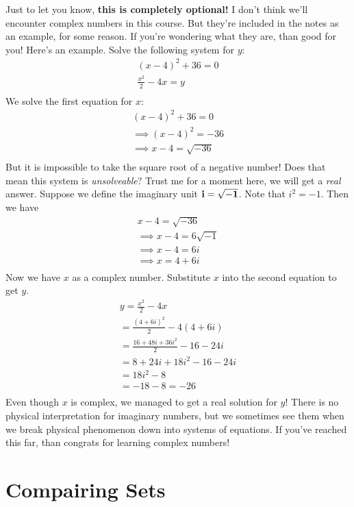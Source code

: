 \myremark
{
	Just to let you know, {\bf this is completely optional!} I don't think we'll encounter complex numbers in this course. But they're included in the notes as an example, for some reason. If you're wondering what they are, than good for you! Here's an example. Solve the following system for $y$:
	\begin{align*}
		(x-4)^2+36=0\\
		\frac{x^2}{2}-4x=y\\
	\end{align*}
	We solve the first equation for $x$:
	\begin{align*}
		(x-4)^2+36=0\\
		\implies (x-4)^2=-36\\
		\implies x-4=\sqrt{-36}\\
	\end{align*}
	But it is impossible to take the square root of a negative number! Does that mean this system is \emph{unsolveable}? Trust me for a moment here, we will get a \emph{real} answer. Suppose we define the imaginary unit $\bf{i} = \sqrt{-1}$. Note that $i^2=-1$. Then we have
	\begin{align*}
		x-4=\sqrt{-36}\\
		\implies x-4=6\sqrt{-1}\\
		\implies x-4=6i\\
		\implies x=4+6i\\
	\end{align*}
	Now we have $x$ as a complex number. Substitute $x$ into the second equation to get $y$.
	\begin{align*}
		y=\frac{x^2}{2}-4x\\
		=\frac{(4+6i)^2}{2}-4(4+6i)\\
		=\frac{16+48i+36i^2}{2}-16-24i\\
		=8+24i+18i^2-16-24i\\
		=18i^2-8\\
		=-18-8=-26\\
	\end{align*}
	Even though $x$ is complex, we managed to get a real solution for $y$! There is no physical interpretation for imaginary numbers, but we sometimes see them when we break physical phenomenon down into systems of equations. If you've reached this far, than congrats for learning complex numbers!
}

\section{Compairing Sets}

